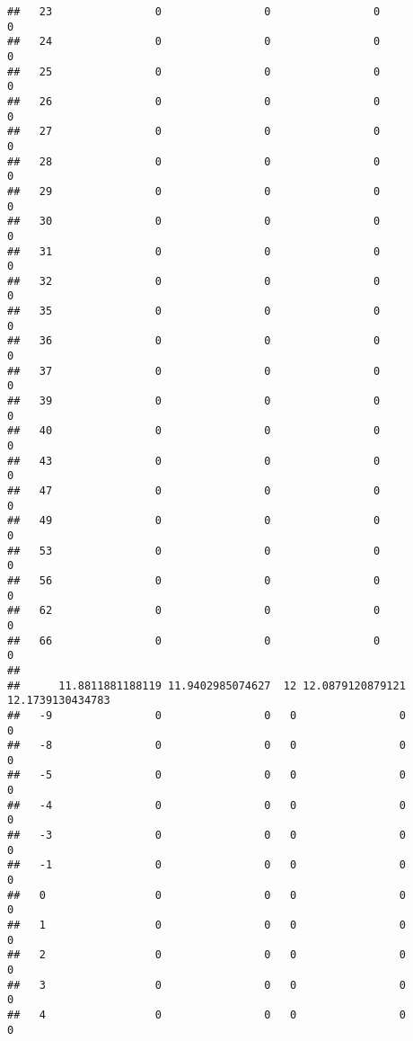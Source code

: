 \documentclass[]{article}
\begin{document}
\begin{verbatim}
##   23                0                0                0                0
##   24                0                0                0                0
##   25                0                0                0                0
##   26                0                0                0                0
##   27                0                0                0                0
##   28                0                0                0                0
##   29                0                0                0                0
##   30                0                0                0                0
##   31                0                0                0                0
##   32                0                0                0                0
##   35                0                0                0                0
##   36                0                0                0                0
##   37                0                0                0                0
##   39                0                0                0                0
##   40                0                0                0                0
##   43                0                0                0                0
##   47                0                0                0                0
##   49                0                0                0                0
##   53                0                0                0                0
##   56                0                0                0                0
##   62                0                0                0                0
##   66                0                0                0                0
##     
##      11.8811881188119 11.9402985074627  12 12.0879120879121 12.1739130434783
##   -9                0                0   0                0                0
##   -8                0                0   0                0                0
##   -5                0                0   0                0                0
##   -4                0                0   0                0                0
##   -3                0                0   0                0                0
##   -1                0                0   0                0                0
##   0                 0                0   0                0                0
##   1                 0                0   0                0                0
##   2                 0                0   0                0                0
##   3                 0                0   0                0                0
##   4                 0                0   0                0                0

\end{verbatim}
\end{document}
